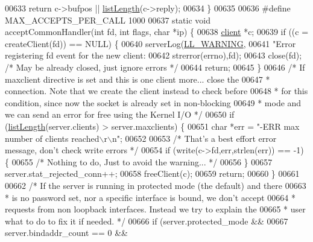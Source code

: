 \begin{DoxyCode}
{{{{00633     \textcolor{keywordflow}{return} c->bufpos || \hyperlink{adlist_8h_afde0ab079f934670e82119b43120e94b}{listLength}(c->reply);
00634 \}
00635 
00636 \textcolor{preprocessor}{#}\textcolor{preprocessor}{define} \textcolor{preprocessor}{MAX\_ACCEPTS\_PER\_CALL} 1000
00637 \textcolor{keyword}{static} \textcolor{keywordtype}{void} acceptCommonHandler(\textcolor{keywordtype}{int} fd, \textcolor{keywordtype}{int} flags, \textcolor{keywordtype}{char} *ip) \{
00638     \hyperlink{structclient}{client} *c;
00639     \textcolor{keywordflow}{if} ((c = createClient(fd)) == NULL) \{
00640         serverLog(\hyperlink{server_8h_a31229b9334bba7d6be2a72970967a14b}{LL\_WARNING},
00641             \textcolor{stringliteral}{"Error registering fd event for the new client: %
00642             strerror(errno),fd);
00643         close(fd); \textcolor{comment}{/* May be already closed, just ignore errors */}
00644         \textcolor{keywordflow}{return};
00645     \}
00646     \textcolor{comment}{/* If maxclient directive is set and this is one client more... close the}
00647 \textcolor{comment}{     * connection. Note that we create the client instead to check before}
00648 \textcolor{comment}{     * for this condition, since now the socket is already set in non-blocking}
00649 \textcolor{comment}{     * mode and we can send an error for free using the Kernel I/O */}
00650     \textcolor{keywordflow}{if} (\hyperlink{adlist_8h_afde0ab079f934670e82119b43120e94b}{listLength}(server.clients) > server.maxclients) \{
00651         \textcolor{keywordtype}{char} *err = \textcolor{stringliteral}{"-ERR max number of clients reached\(\backslash\)r\(\backslash\)n"};
00652 
00653         \textcolor{comment}{/* That's a best effort error message, don't check write errors */}
00654         \textcolor{keywordflow}{if} (write(c->fd,err,strlen(err)) == -1) \{
00655             \textcolor{comment}{/* Nothing to do, Just to avoid the warning... */}
00656         \}
00657         server.stat\_rejected\_conn++;
00658         freeClient(c);
00659         \textcolor{keywordflow}{return};
00660     \}
00661 
00662     \textcolor{comment}{/* If the server is running in protected mode (the default) and there}
00663 \textcolor{comment}{     * is no password set, nor a specific interface is bound, we don't accept}
00664 \textcolor{comment}{     * requests from non loopback interfaces. Instead we try to explain the}
00665 \textcolor{comment}{     * user what to do to fix it if needed. */}
00666     \textcolor{keywordflow}{if} (server.protected\_mode &&
00667         server.bindaddr\_count == 0 &&
}}}}}
\end{DoxyCode}
